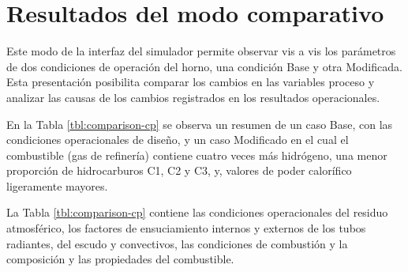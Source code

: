 \section{Resultados del modo comparativo}
\par Este modo de la interfaz del simulador permite observar vis a vis los parámetros de dos condiciones de operación del horno, una condición Base y otra Modificada. Esta presentación posibilita comparar los cambios en las variables proceso y analizar las causas de los cambios registrados en los resultados operacionales.
\par En la Tabla \ref{tbl:comparison-cp} se observa un resumen de un caso Base, con las condiciones operacionales de diseño, y un caso Modificado en el cual el combustible (gas de refinería) contiene cuatro veces más hidrógeno, una menor proporción de hidrocarburos C1, C2 y C3, y, valores de poder calorífico ligeramente mayores.
\par La Tabla \ref{tbl:comparison-cp} contiene las condiciones operacionales del residuo atmosférico, los factores de ensuciamiento internos y externos de los tubos radiantes, del escudo y convectivos, las condiciones de combustión y la composición y las propiedades del combustible.
